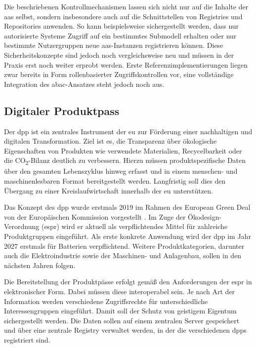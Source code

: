 Die beschriebenen Kontrollmechanismen lassen sich nicht nur auf die Inhalte der \acs{aas} selbst, sondern insbesondere auch auf die Schnittstellen von Registries und Repositories anwenden.
So kann beispielsweise sichergestellt werden, dass nur autorisierte Systeme Zugriff auf ein bestimmtes Submodell erhalten oder nur bestimmte Nutzergruppen neue \acs{aas}-Instanzen registrieren können.
Diese Sicherheitskonzepte sind jedoch noch vergleichsweise neu und müssen in der Praxis erst noch weiter erprobt werden.
Erste Referenzimplementierungen liegen zwar bereits in Form rollenbasierter Zugriffskontrollen vor, eine vollständige Integration des \acs{abac}-Ansatzes steht jedoch noch aus.


\subsection{Digitaler Produktpass}
Der \acs{dpp} ist ein zentrales Instrument der \acs{eu} zur Förderung einer nachhaltigen und digitalen Transformation. 
Ziel ist es, die Transparenz über ökologische Eigenschaften von Produkten wie verwendete Materialien, Recycelbarkeit oder die CO\textsubscript{2}-Bilanz deutlich zu verbessern.
Hierzu müssen produktspezifische Daten über den gesamten Lebenszyklus hinweg erfasst und in einem menschen- und maschinenlesbaren Format bereitgestellt werden. \cite{DPPEinführung}
Langfristig soll dies den Übergang zu einer Kreislaufwirtschaft innerhalb der \acs{eu} unterstützen.

Das Konzept des \acs{dpp} wurde erstmals 2019 im Rahmen des European Green Deal von der Europäischen Kommission vorgestellt \cite{GreenDeal}.
Im Zuge der Ökodesign-Verordnung (\ac{espr}) \cite{ESPR} wird er aktuell als verpflichtendes Mittel für zahlreiche Produktgruppen eingeführt.
Als erste konkrete Anwendung wird der \acs{dpp} im Jahr 2027 erstmals für Batterien verpflichtend.
Weitere Produktkategorien, darunter auch die Elektroindustrie sowie der Maschinen- und Anlagenbau, sollen in den nächsten Jahren folgen.

Die Bereitstellung der Produktpässe erfolgt gemäß den Anforderungen der \acs{espr} in elektronischer Form. 
Dabei müssen diese interoperabel sein.
Je nach Art der Information werden verschiedene Zugriffsrechte für unterschiedliche Interessengruppen eingeführt. 
Damit soll der Schutz von geistigem Eigentum sichergestellt werden.
Die Daten sollen auf einem zentralen Server gespeichert und über eine zentrale Registry verwaltet werden, in der die verschiedenen \acsp{dpp} registriert sind.
\cite{CIRPASS}

